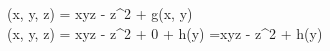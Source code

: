 \phi(x, y, z) = xyz - z^2 + g(x, y) \implies\\
\phi(x, y, z) = xyz - z^2 + 0 + h(y) =xyz - z^2 + h(y)
